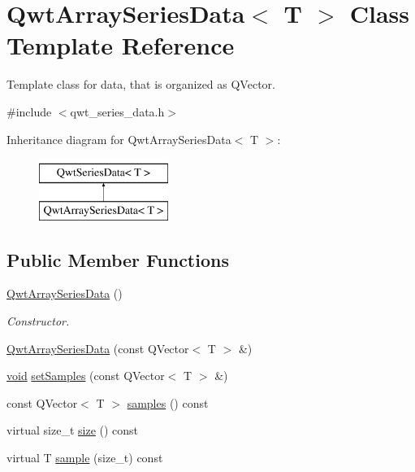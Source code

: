 \hypertarget{class_qwt_array_series_data}{\section{Qwt\-Array\-Series\-Data$<$ T $>$ Class Template Reference}
\label{class_qwt_array_series_data}
}


Template class for data, that is organized as Q\-Vector.  




{\ttfamily \#include $<$qwt\-\_\-series\-\_\-data.\-h$>$}

Inheritance diagram for Qwt\-Array\-Series\-Data$<$ T $>$\-:\begin{figure}[H]
\begin{center}
\leavevmode
\includegraphics[height=2.000000cm]{class_qwt_array_series_data}
\end{center}
\end{figure}
\subsection*{Public Member Functions}
\begin{DoxyCompactItemize}
\item 
\hyperlink{class_qwt_array_series_data_a3cb14bbe2b27bf8d49994d80e8eab3ee}{Qwt\-Array\-Series\-Data} ()
\begin{DoxyCompactList}\small\item\em Constructor. \end{DoxyCompactList}\item 
\hyperlink{class_qwt_array_series_data_a21053c2e3a9859d992ee283d84dbb459}{Qwt\-Array\-Series\-Data} (const Q\-Vector$<$ T $>$ \&)
\item 
\hyperlink{group___u_a_v_objects_plugin_ga444cf2ff3f0ecbe028adce838d373f5c}{void} \hyperlink{class_qwt_array_series_data_ac5ebf4034eaabc83c7a21f2adcb79aa5}{set\-Samples} (const Q\-Vector$<$ T $>$ \&)
\item 
const Q\-Vector$<$ T $>$ \hyperlink{class_qwt_array_series_data_a2d3f931bd28f40bc6e13c4b507e5b502}{samples} () const 
\item 
virtual size\-\_\-t \hyperlink{class_qwt_array_series_data_a52c123dcc321a03ccd18c2c138318025}{size} () const 
\item 
virtual T \hyperlink{class_qwt_array_series_data_af10504cdd3e506ab6b5502b1f17535d0}{sample} (size\-\_\-t) const 
\end{DoxyCompactItemize}
